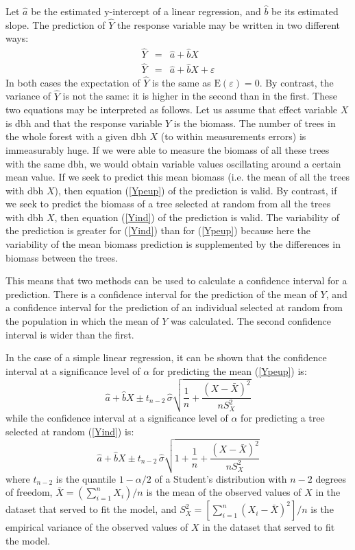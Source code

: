 Let $\hat{a}$ be the estimated y-intercept of a linear regression, and $\hat{b}$ be its estimated slope. The prediction of $\hat{Y}$ the response variable may be written in two different ways:
\begin{eqnarray}
\hat{Y}&=&\hat{a}+\hat{b}X\label{Ypeup}\\ %
\hat{Y}&=&\hat{a}+\hat{b}X+\varepsilon\label{Yind}
\end{eqnarray}
In both cases the expectation of $\hat{Y}$ is the same as $\mathrm{E}(\varepsilon)=0$. By contrast, the variance of $\hat{Y}$
is not the same: it is higher in the second than in the first. These two equations may be interpreted as follows. Let us assume that effect variable $X$ is dbh and that the response variable $Y$ is the biomass. The number of trees in the whole forest with a given dbh $X$ (to within measurements errors) is immeasurably huge. If we were able to measure the biomass of all these trees with the same dbh, we would obtain variable values oscillating around a certain mean value. If we seek to predict this mean biomass (i.e. the mean of all the trees with dbh $X$), then equation (\ref{Ypeup}) of the prediction is valid. By contrast, if we seek to predict the biomass of a tree selected at random from all the trees with dbh $X$, then equation (\ref{Yind}) of the prediction is valid. The variability of the prediction is greater for (\ref{Yind}) than for (\ref{Ypeup}) because here the variability of the mean biomass prediction is supplemented by the differences in biomass between the trees.

This means that two methods can be used to calculate a confidence interval for a prediction. There is a confidence interval for the prediction of the mean of $Y$, and a confidence interval for the prediction of an individual selected at random from the population in which the mean of $Y$ was calculated. The second confidence interval is wider than the first.

In the case of a simple linear regression, it can be shown \citep[p.373--374]{saporta90} that the confidence interval at a significance level of $\alpha$ for predicting the mean (\ref{Ypeup}) is:
\begin{equation}
\hat{a}+\hat{b}X\pm
t_{n-2}\,\hat{\sigma}\sqrt{\frac{1}{n}+\frac{(X-\bar{X})^2}{nS_X^2}}
\label{icpeup}
\end{equation}
while the confidence interval at a significance level of $\alpha$ for predicting a tree selected at random (\ref{Yind}) is:
\begin{equation}
\hat{a}+\hat{b}X\pm
t_{n-2}\,\hat{\sigma}\sqrt{1+\frac{1}{n}+\frac{(X-\bar{X})^2}{nS_X^2}}
\label{icind}
\end{equation}
where $t_{n-2}$ is the quantile $1-\alpha/2$ of a Student's distribution with
$n-2$ degrees of freedom, $\bar{X}=(\sum_{i=1}^nX_i)/n$ is the mean of the observed values of $X$ in the dataset that served to fit the model, and
$S_X^2=[\sum_{i=1}^n(X_i-\bar{X})^2]/n$ is the empirical variance of the observed values of $X$ in the dataset that served to fit the model.


